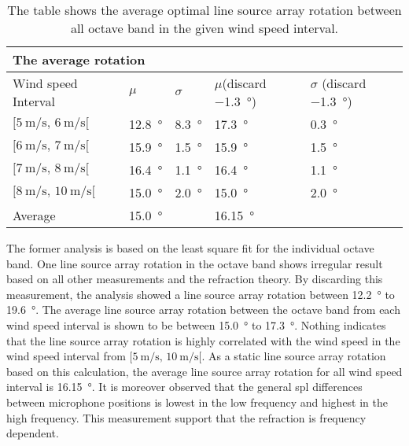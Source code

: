   \begin{table}[H]
 \centering
  \caption{The table shows the average optimal line source array rotation between all octave band in the given wind speed interval.}
\begin{tabular}{l|l|l|l|l}
\multicolumn{2}{l}{The average rotation}      \\ \hline
Wind speed Interval & $\mu$  & $\sigma$ & $\mu$(discard  \SI{-1.3}{\degree}) & $\sigma$ (discard  \SI{-1.3}{\degree}) \\ \hline
  $[\SI{5}{\meter\per\second},\, \SI{6}{\meter\per\second}[ $       &   \SI{12.8}{\degree}  &   \SI{8.3}{\degree}  &   \SI{17.3}{\degree}   &   \SI{0.3}{\degree}\\
    $[\SI{6}{\meter\per\second},\, \SI{7}{\meter\per\second}[ $     &   \SI{15.9}{\degree}   &   \SI{1.5}{\degree} &   \SI{15.9}{\degree}   &   \SI{1.5}{\degree}\\
  $[\SI{7}{\meter\per\second},\, \SI{8}{\meter\per\second}[ $       &    \SI{16.4}{\degree}  &   \SI{1.1}{\degree} &    \SI{16.4}{\degree}&    \SI{1.1}{\degree}  \\
   $[\SI{8}{\meter\per\second},\, \SI{10}{\meter\per\second}[ $      &     \SI{15.0}{\degree}  &   \SI{2.0}{\degree} &     \SI{15.0}{\degree} &     \SI{2.0}{\degree} \\ \hline
    Average      &     \SI{15.0}{\degree} &  &\SI{16.15}{\degree}&
\end{tabular}
\label{res:tab:cross_mean}
\end{table}  
 
The former analysis is based on the least square fit for the individual octave band. One line source array rotation in the  octave band shows irregular result based on all other measurements and the refraction theory. By discarding this measurement, the analysis showed a line source array rotation between  \SI{12.2}{\degree} to  \SI{19.6}{\degree}. The average line source array rotation between the octave band from each wind speed interval is shown to be between \SI{15.0}{\degree} to \SI{17.3}{\degree}. Nothing indicates that the line source array rotation is highly correlated with the wind speed in the  wind speed interval from $[\SI{5}{\meter\per\second},\, \SI{10}{\meter\per\second}[ $. As a static line source array rotation based on this calculation, the average line source array rotation for all wind speed interval is \SI{16.15}{\degree}. It is moreover observed that the general \gls{spl} differences between microphone positions is lowest in the low frequency and highest in the high frequency. This measurement support that the refraction is frequency dependent.



